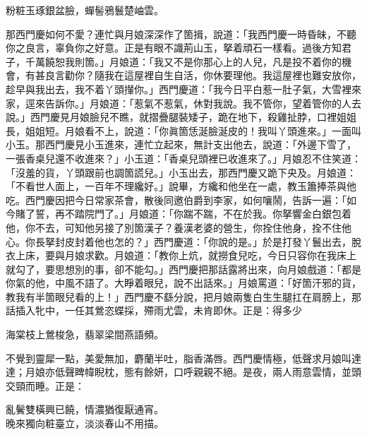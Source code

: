 \begin{myquote} 
粉粧玉琢銀盆臉，蟬髻鴉鬟楚岫雲。{}
\end{myquote} 

那西門慶如何不愛？{}連忙與月娘深深作了箇揖，說道：「我西門慶一時昏昧，不聽你之良言，辜負你之好意。正是有眼不識荊山玉，拏着頑石一樣看。過後方知君子，千萬饒恕我則箇。」月娘道：「我又不是你那心上的人兒，凡是投不着你的機會，有甚良言勸你？隨我在這屋裡自生自活，你休要理他。我這屋裡也難安放你，趁早與我出去，我不着丫頭攆你。」西門慶道：「我今日平白惹一肚子氣，大雪裡來家，逕來告訴你。」月娘道：「惹氣不惹氣，休對我說。我不管你，望着管你的人去說。」西門慶見月娘臉兒不瞧，就摺疊腿裝矮子，跪在地下，殺雞扯脖，口裡姐姐長，姐姐短。月娘看不上，說道：「你眞箇恁涎臉涎皮的！我叫丫頭進來。」一面叫小玉。那西門慶見小玉進來，連忙立起來，無計支出他去，說道：「外邊下雪了，一張香桌兒還不收進來？」小玉道：「香桌兒頭裡已收進來了。」月娘忍不住笑道：「沒羞的貨，丫頭跟前也調箇謊兒。」{}小玉出去，那西門慶又跪下央及。月娘道：「不看世人面上，一百年不理纔好。」說畢，方纔和他坐在一處，教玉簫捧茶與他吃。西門慶因把今日常家茶會，散後同邀伯爵到李家，如何嚷鬧，告訴一遍：「如今賭了誓，再不踏院門了。」月娘道：「你踹不踹，不在於我。你拏響金白銀包着他，你不去，可知他另接了別箇漢子？養漢老婆的營生，你拴住他身，拴不住他心。你長拏封皮封着他也怎的？」西門慶道：「你說的是。」於是打發丫鬟出去，脫衣上床，要與月娘求歡。月娘道：「教你上炕，就撈食兒吃，今日只容你在我床上就勾了，要思想別的事，卻不能勾。」西門慶把那話露將出來，向月娘戲道：「都是你氣的他，中風不語了。大睜着眼兒，說不出話來。」月娘罵道：「好箇汗邪的貨，教我有半箇眼兒看的上！」西門慶不繇分說，把月娘兩隻白生生腿扛在肩膀上，那話插入牝中，一任其鶯恣蝶採，殢雨尤雲，未肯即休。正是：得多少

\begin{myquote} 
海棠枝上鶯梭急，翡翠梁間燕語頻。
\end{myquote} 

不覺到靈犀一點，美愛無加，麝蘭半吐，脂香滿唇。西門慶情極，低聲求月娘叫達達；月娘亦低聲睥幃睨枕，態有餘妍，{}口呼親親不絕。是夜，兩人雨意雲情，並頭交頸而睡。正是：

\begin{myquote} 
亂鬢雙橫興已饒，情濃猶復厭通宵。\\晚來獨向粧臺立，淡淡春山不用描。
\end{myquote} 

